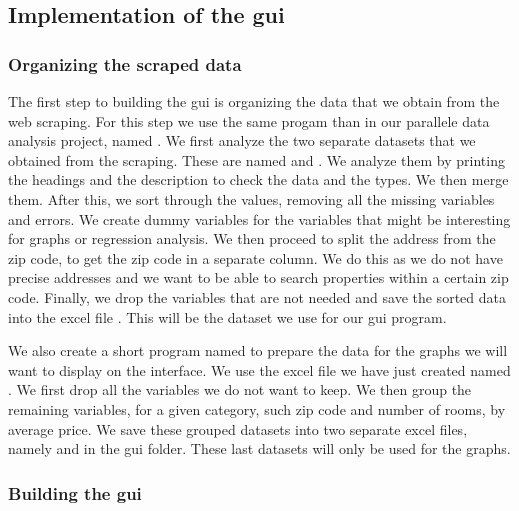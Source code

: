 \documentclass[main]{subfiles}
\begin{document}
\subsection{Implementation of the \ac{gui}}

\subsubsection{Organizing the scraped data}
The first step to building the \ac{gui} is organizing the data that we obtain from the web scraping.
For this step we use the same progam than in our parallele data analysis project, named .
We first analyze the two separate datasets that we obtained from the scraping. 
These are named  and .
We analyze them by printing the headings and the description to check the data and the types.
We then merge them. After this, we sort through the values, removing all the missing variables and errors. 
We create dummy variables for the variables that might be interesting for graphs or regression analysis.
We then proceed to split the address from the zip code, to get the zip code in a separate column. 
We do this as we do not have precise addresses and we want to be able to search properties within a certain zip code. 
Finally, we drop the variables that are not needed and save the sorted data into the excel file .
This will be the dataset we use for our \ac{gui} program. \par
We also create a short program named  to prepare the data for the graphs 
we will want to display on the interface. We use the excel file we have just created named .
We first drop all the variables we do not want to keep. 
We then group the remaining variables, for a given category, such zip code and number of rooms, by average price.
We save these grouped datasets into two separate excel files, namely  and  in the \ac{gui} folder.
These last datasets will only be used for the graphs.\par


\vspace*{5pt}
\subsubsection{Building the \ac{gui}}
\end{document}
